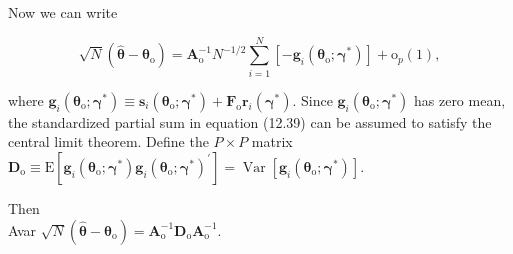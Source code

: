 \documentclass[10pt]{article}
\begin{document}
Now we can write


\begin{equation*}
\sqrt{N}\left(\hat{\boldsymbol{\theta}}-\boldsymbol{\theta}_{\mathrm{o}}\right)=\mathbf{A}_{\mathrm{o}}^{-1} N^{-1 / 2} \sum_{i=1}^{N}\left[-\mathbf{g}_{i}\left(\boldsymbol{\theta}_{\mathrm{o}} ; \boldsymbol{\gamma}^{*}\right)\right]+\mathrm{o}_{p}(1), \tag{12.39}
\end{equation*}


where $\mathbf{g}_{i}\left(\boldsymbol{\theta}_{\mathrm{o}} ; \boldsymbol{\gamma}^{*}\right) \equiv \mathbf{s}_{i}\left(\boldsymbol{\theta}_{\mathrm{o}} ; \boldsymbol{\gamma}^{*}\right)+\mathbf{F}_{\mathrm{o}} \mathbf{r}_{i}\left(\boldsymbol{\gamma}^{*}\right)$. Since $\mathbf{g}_{i}\left(\boldsymbol{\theta}_{\mathrm{o}} ; \boldsymbol{\gamma}^{*}\right)$ has zero mean, the standardized partial sum in equation (12.39) can be assumed to satisfy the central limit theorem. Define the $P \times P$ matrix\\
$\mathbf{D}_{\mathrm{o}} \equiv \mathrm{E}\left[\mathbf{g}_{i}\left(\boldsymbol{\theta}_{\mathrm{o}} ; \boldsymbol{\gamma}^{*}\right) \mathbf{g}_{i}\left(\boldsymbol{\theta}_{\mathrm{o}} ; \boldsymbol{\gamma}^{*}\right)^{\prime}\right]=\operatorname{Var}\left[\mathbf{g}_{i}\left(\boldsymbol{\theta}_{\mathrm{o}} ; \boldsymbol{\gamma}^{*}\right)\right]$.

Then\\
Avar $\sqrt{N}\left(\hat{\boldsymbol{\theta}}-\boldsymbol{\theta}_{\mathrm{o}}\right)=\mathbf{A}_{\mathrm{o}}^{-1} \mathbf{D}_{\mathrm{o}} \mathbf{A}_{\mathrm{o}}^{-1}$.
\end{document}
